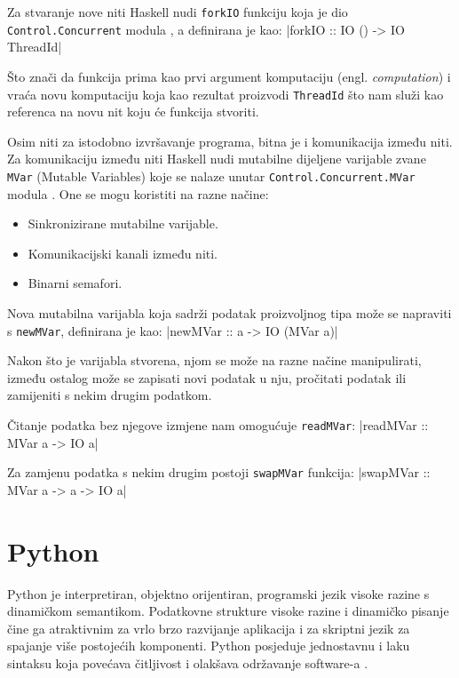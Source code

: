 Za stvaranje nove niti Haskell nudi \texttt{forkIO} funkciju koja
je dio \texttt{Control.Concurrent} modula
\cite{control_concurrent}, a definirana je kao:
|forkIO :: IO () -> IO ThreadId|

Što znači da funkcija prima kao prvi argument komputaciju (engl.
\emph{computation}) i vraća novu komputaciju koja kao rezultat proizvodi
\texttt{ThreadId} što nam služi kao referenca na novu nit koju će
funkcija stvoriti.

Osim niti za istodobno izvršavanje programa, bitna je i komunikacija između niti.
Za komunikaciju između niti Haskell nudi mutabilne dijeljene varijable zvane
\texttt{MVar} (Mutable Variables) koje se nalaze unutar
\texttt{Control.Concurrent.MVar} modula \cite{mvar}. One se mogu
koristiti na razne načine:

\begin{itemize}
\item Sinkronizirane mutabilne varijable.
\item Komunikacijski kanali između niti.
\item Binarni semafori.
\end{itemize}

Nova mutabilna varijabla koja sadrži podatak proizvoljnog tipa može se napraviti
s \texttt{newMVar}, definirana je kao:
|newMVar :: a -> IO (MVar a)|

Nakon što je varijabla stvorena, njom se može na razne načine manipulirati, između
ostalog može se zapisati novi podatak u nju, pročitati podatak ili zamijeniti s
nekim drugim podatkom.

Čitanje podatka bez njegove izmjene nam omogućuje
\texttt{readMVar}:
|readMVar :: MVar a -> IO a|

Za zamjenu podatka s nekim drugim postoji \texttt{swapMVar}
funkcija:
|swapMVar :: MVar a -> a -> IO a|

\newpage
\section{Python}

Python je interpretiran, objektno orijentiran, programski jezik visoke razine
s dinamičkom semantikom. Podatkovne strukture visoke razine i dinamičko pisanje
čine ga atraktivnim za vrlo brzo razvijanje aplikacija i za skriptni jezik za
spajanje više postojećih komponenti.
Python posjeduje jednostavnu i laku sintaksu koja povećava čitljivost i
olakšava održavanje software-a \cite{python_ref}.

